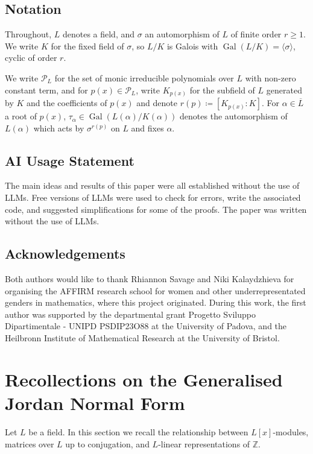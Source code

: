 \documentclass[10pt, reqno, hidelinks]{amsart}
\DeclareMathOperator{\Gal}{Gal}
\newcommand{\bZ}{{\mathbb Z}}
\newcommand{\sP}{{\mathcal P}}
\numberwithin{thm}{subsection}
\theoremstyle{definition}
\begin{document}
\subsection*{Notation}

Throughout, $L$ denotes a field, and $\sigma$ an automorphism of $L$ of finite order $r \geq 1$. We write $K$ for the fixed field of $\sigma$, so $L/K$ is Galois with $\Gal(L/K) = \langle \sigma \rangle$, cyclic of order $r$.

We write $\sP_L$ for the set of monic irreducible polynomials over $L$ with non-zero constant term, and for $p(x) \in \sP_L$, write $K_{p(x)}$ for the subfield of $L$ generated by $K$ and the coefficients of $p(x)$ and denote $r(p) \coloneqq [K_{p(x)}:K]$. For $\alpha \in \overline{L}$ a root of $p(x)$, $\tau_{\alpha} \in \Gal(L(\alpha) / K(\alpha))$ denotes the automorphism of $L(\alpha)$ which acts by $\sigma^{r(p)}$ on $L$ and fixes $\alpha$.

\subsection*{AI Usage Statement} The main ideas and results of this paper were all established without the use of LLMs. Free versions of LLMs were used to check for errors, write the associated code, and suggested simplifications for some of the proofs. The paper was written without the use of LLMs.

\subsection*{Acknowledgements} Both authors would like to thank Rhiannon Savage and Niki Kalaydzhieva for organising the AFFIRM research school for women and other underrepresentated genders in mathematics, where this project originated. During this work, the first author was supported by the departmental grant Progetto Sviluppo Dipartimentale - UNIPD PSDIP23O88 at the University of Padova, and the Heilbronn Institute of Mathematical Research at the University of Bristol.


\section{Recollections on the Generalised Jordan Normal Form}\label{sect:GJNF}

Let $L$ be a field. In this section we recall the relationship between $L[x]$-modules, matrices over $L$ up to conjugation, and $L$-linear representations of $\bZ$.
\end{document}
